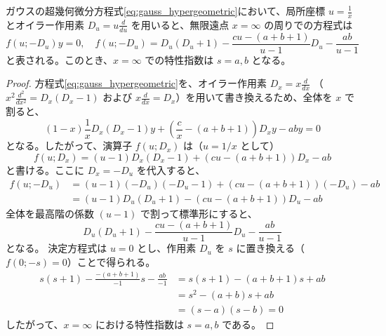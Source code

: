 \begin{example}
ガウスの超幾何微分方程式\eqref{eq:gauss_hypergeometric}において、局所座標 $u=\frac{1}{x}$ とオイラー作用素 $D_{u} = u\frac{d}{du}$ を用いると、無限遠点 $x=\infty$ の周りでの方程式は
\[
f(u; -D_{u})y = 0, \quad f(u; -D_{u}) = D_{u}(D_{u}+1) - \frac{cu-(a+b+1)}{u-1}D_{u} - \frac{ab}{u-1}
\]
と表される。このとき、$x=\infty$ での特性指数は $s=a, b$ となる。
\end{example}

\begin{proof}
方程式\eqref{eq:gauss_hypergeometric}を、オイラー作用素 $D_{x} = x\frac{d}{dx}$ （$x^{2}\frac{d^{2}}{dx^{2}} = D_{x}(D_{x}-1)$ および $x\frac{d}{dx} = D_{x}$）を用いて書き換えるため、全体を $x$ で割ると、
\[
(1-x) \frac{1}{x} D_{x}(D_{x}-1)y + \left( \frac{c}{x} - (a+b+1) \right) D_{x}y - aby = 0
\]
となる。したがって、演算子 $f(u; D_{x})$ は（$u=1/x$ として）
\[
f(u; D_{x}) = (u-1)D_{x}(D_{x}-1) + (cu-(a+b+1))D_{x} - ab
\]
と書ける。ここに $D_{x} = -D_{u}$ を代入すると、
\begin{align*}
f(u; -D_{u}) &= (u-1)(-D_{u})(-D_{u}-1) + (cu-(a+b+1))(-D_{u}) - ab \\
&= (u-1)D_{u}(D_{u}+1) - (cu-(a+b+1))D_{u} - ab
\end{align*}
全体を最高階の係数 $(u-1)$ で割って標準形にすると、
\[
D_{u}(D_{u}+1) - \frac{cu-(a+b+1)}{u-1}D_{u} - \frac{ab}{u-1}
\]
となる。
決定方程式は $u=0$ とし、作用素 $D_{u}$ を $s$ に置き換える（$f(0; -s) = 0$）ことで得られる。
\begin{align*}
s(s+1) - \frac{-(a+b+1)}{-1}s - \frac{ab}{-1} &= s(s+1) - (a+b+1)s + ab \\
&= s^{2} - (a+b)s + ab \\
&= (s-a)(s-b) = 0
\end{align*}
したがって、$x=\infty$ における特性指数は $s=a, b$ である。
\end{proof}

